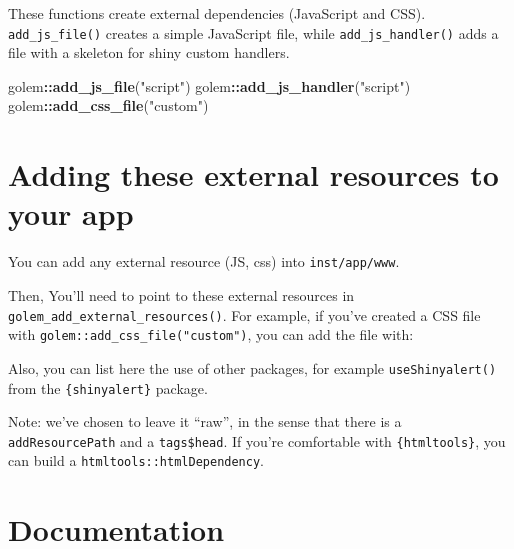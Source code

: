 \documentclass[]{book}
\newenvironment{Shaded}{\begin{snugshade}}{\end{snugshade}}
\newcommand{\DataTypeTok}[1]{\textcolor[rgb]{0.13,0.29,0.53}{#1}}
\newcommand{\KeywordTok}[1]{\textcolor[rgb]{0.13,0.29,0.53}{\textbf{#1}}}
\newcommand{\NormalTok}[1]{#1}
\newcommand{\OperatorTok}[1]{\textcolor[rgb]{0.81,0.36,0.00}{\textbf{#1}}}
\newcommand{\StringTok}[1]{\textcolor[rgb]{0.31,0.60,0.02}{#1}}
\begin{document}
These functions create external dependencies (JavaScript and CSS). \texttt{add\_js\_file()} creates a simple JavaScript file, while \texttt{add\_js\_handler()} adds a file with a skeleton for shiny custom handlers.

\begin{Shaded}
\begin{Highlighting}[]
\NormalTok{golem}\OperatorTok{::}\KeywordTok{add_js_file}\NormalTok{(}\StringTok{"script"}\NormalTok{)}
\NormalTok{golem}\OperatorTok{::}\KeywordTok{add_js_handler}\NormalTok{(}\StringTok{"script"}\NormalTok{)}
\NormalTok{golem}\OperatorTok{::}\KeywordTok{add_css_file}\NormalTok{(}\StringTok{"custom"}\NormalTok{)}
\end{Highlighting}
\end{Shaded}

\hypertarget{adding-these-external-resources-to-your-app}{%
\section{Adding these external resources to your app}\label{adding-these-external-resources-to-your-app}}

You can add any external resource (JS, css) into \texttt{inst/app/www}.

Then, You'll need to point to these external resources in \texttt{golem\_add\_external\_resources()}. For example, if you've created a CSS file with \texttt{golem::add\_css\_file("custom")}, you can add the file with:

\begin{Shaded}
\end{Shaded}

Also, you can list here the use of other packages, for example \texttt{useShinyalert()} from the \texttt{\{shinyalert\}} package.

Note: we've chosen to leave it ``raw'', in the sense that there is a \texttt{addResourcePath} and a \texttt{tags\$head}. If you're comfortable with \texttt{\{htmltools\}}, you can build a \texttt{htmltools::htmlDependency}.

\hypertarget{documentation}{%
\section{Documentation}\label{documentation}}
\end{document}
